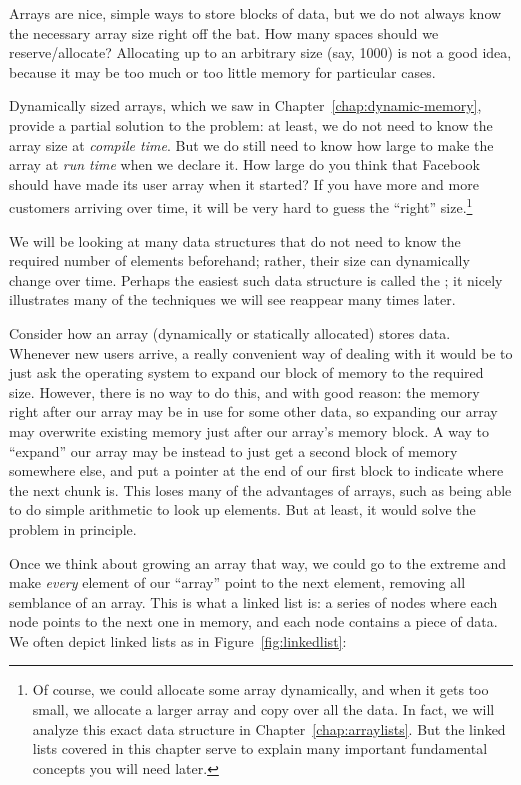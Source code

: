 Arrays are nice, simple ways to store blocks of data,
but we do not always know the necessary array size right off the bat.
How many spaces should we reserve/allocate? 
Allocating up to an arbitrary size (say, 1000) is not a good idea,
because it may be too much or too little memory for particular cases.

Dynamically sized arrays, which we saw in
Chapter~\ref{chap:dynamic-memory},
provide a partial solution to the problem:
at least, we do not need to know the array size at \emph{compile time}.
But we do still need to know how large to make the array at \emph{run time}
when we declare it. 
How large do you think that Facebook should have made its user array
when it started?
If you have more and more customers arriving over time,
it will be very hard to guess the ``right'' size.\footnote{%
  Of course, we could allocate some array dynamically,
  and when it gets too small, we allocate a larger array and copy over
  all the data. In fact, we will analyze this exact data structure in
  Chapter~\ref{chap:arraylists}.
  But the linked lists covered in this chapter serve to explain many
  important fundamental concepts you will need later.}

We will be looking at many data structures that do not
need to know the required number of elements beforehand;
rather, their size can dynamically change over time. 
Perhaps the easiest such data structure is called the
;
it nicely illustrates many of the techniques we will see reappear many
times later. 

Consider how an array (dynamically or statically allocated) stores
data. Whenever new users arrive, a really convenient way of dealing
with it would be to just ask the operating system to expand our block
of memory to the required size.
However, there is no way to do this, and with good reason:
the memory right after our array may be in use for some other data,
so expanding our array may overwrite existing memory just after our
array's memory block. 
A way to ``expand'' our array may be instead to just get a second
block of memory somewhere else, and put a pointer at the end of our
first block to indicate where the next chunk is. 
This loses many of the advantages of arrays,
such as being able to do simple arithmetic to look up elements.
But at least, it would solve the problem in principle.

Once we think about growing an array that way,
we could go to the extreme and make \emph{every} element of our
``array'' point to the next element, removing all semblance of an array. 
This is what a linked list is: a series of nodes where each node points
to the next one in memory, and each node contains a piece of data.
We often depict linked lists as in Figure~\ref{fig:linkedlist}:

